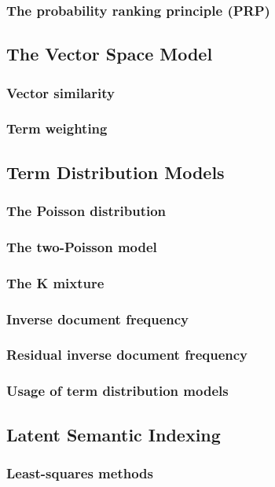 \documentclass[a4paper]{article}
\begin{document}
\subsubsection{The probability ranking principle (PRP)}
\subsection{The Vector Space Model}
\subsubsection{Vector similarity}
\subsubsection{Term weighting}
\subsection{Term Distribution Models}
\subsubsection{The Poisson distribution}
\subsubsection{The two-Poisson model}
\subsubsection{The K mixture}
\subsubsection{Inverse document frequency}
\subsubsection{Residual inverse document frequency}
\subsubsection{Usage of term distribution models}
\subsection{Latent Semantic Indexing}
\subsubsection{Least-squares methods}
\end{document}
